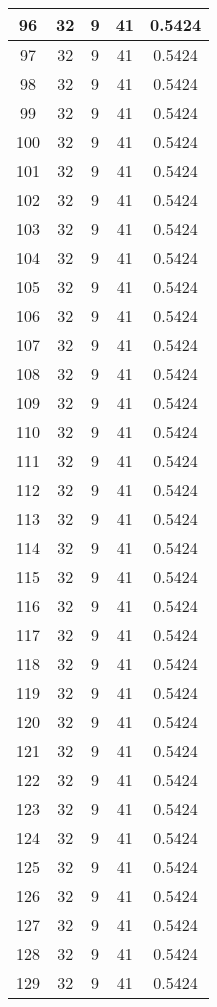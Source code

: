 \documentclass[letterpaper, 12pt]{article}
\begin{document}
\begin{longtable}{|c|c|c|c|c|}
96 & 32 & 9 & 41 & 0.5424 \\
\hline
97 & 32 & 9 & 41 & 0.5424 \\
\hline
98 & 32 & 9 & 41 & 0.5424 \\
\hline
99 & 32 & 9 & 41 & 0.5424 \\
\hline
100 & 32 & 9 & 41 & 0.5424 \\
\hline
101 & 32 & 9 & 41 & 0.5424 \\
\hline
102 & 32 & 9 & 41 & 0.5424 \\
\hline
103 & 32 & 9 & 41 & 0.5424 \\
\hline
104 & 32 & 9 & 41 & 0.5424 \\
\hline
105 & 32 & 9 & 41 & 0.5424 \\
\hline
106 & 32 & 9 & 41 & 0.5424 \\
\hline
107 & 32 & 9 & 41 & 0.5424 \\
\hline
108 & 32 & 9 & 41 & 0.5424 \\
\hline
109 & 32 & 9 & 41 & 0.5424 \\
\hline
110 & 32 & 9 & 41 & 0.5424 \\
\hline
111 & 32 & 9 & 41 & 0.5424 \\
\hline
112 & 32 & 9 & 41 & 0.5424 \\
\hline
113 & 32 & 9 & 41 & 0.5424 \\
\hline
114 & 32 & 9 & 41 & 0.5424 \\
\hline
115 & 32 & 9 & 41 & 0.5424 \\
\hline
116 & 32 & 9 & 41 & 0.5424 \\
\hline
117 & 32 & 9 & 41 & 0.5424 \\
\hline
118 & 32 & 9 & 41 & 0.5424 \\
\hline
119 & 32 & 9 & 41 & 0.5424 \\
\hline
120 & 32 & 9 & 41 & 0.5424 \\
\hline
121 & 32 & 9 & 41 & 0.5424 \\
\hline
122 & 32 & 9 & 41 & 0.5424 \\
\hline
123 & 32 & 9 & 41 & 0.5424 \\
\hline
124 & 32 & 9 & 41 & 0.5424 \\
\hline
125 & 32 & 9 & 41 & 0.5424 \\
\hline
126 & 32 & 9 & 41 & 0.5424 \\
\hline
127 & 32 & 9 & 41 & 0.5424 \\
\hline
128 & 32 & 9 & 41 & 0.5424 \\
\hline
129 & 32 & 9 & 41 & 0.5424 \\

\end{longtable}
\end{document}
